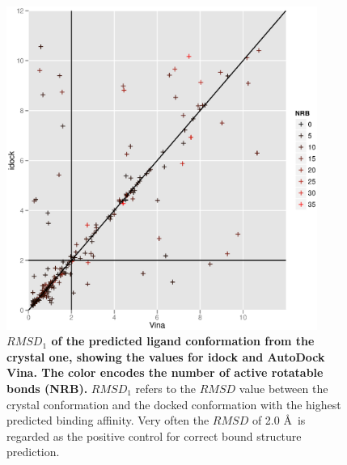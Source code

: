 \documentclass[10pt]{article}
\begin{document}
\begin{figure}[!ht]
\begin{center}
\includegraphics[width=4in]{VinaConf1RMSD-idockConf1RMSD.eps}
\end{center}
\caption{
{\bf $RMSD_1$ of the predicted ligand conformation from the crystal one, showing the values for idock and AutoDock Vina. The color encodes the number of active rotatable bonds (NRB).} $RMSD_1$ refers to the $RMSD$ value between the crystal conformation and the docked conformation with the highest predicted binding affinity. Very often the $RMSD$ of 2.0 \AA\ is regarded as the positive control for correct bound structure prediction.
}
\label{VinaConf1RMSD-idockConf1RMSD}
\end{figure}
\end{document}
